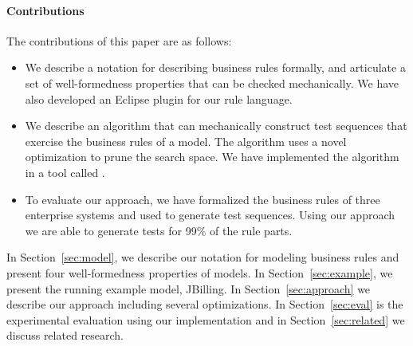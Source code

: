 \paragraph*{Contributions}

The contributions of this paper are as follows:
\begin{itemize}[noitemsep]
\item We describe a notation for describing business rules formally, and articulate
  a set of well-formedness properties that can be checked mechanically. We have 
  also developed an Eclipse plugin for our rule language.
\item We describe an algorithm that can mechanically construct test sequences
  that exercise the business rules of a model. The algorithm uses a
  novel optimization to prune the search space. We have implemented
  the algorithm in a tool called \tool{}.
\item To evaluate our approach, we have formalized the business rules
  of three enterprise systems and used \tool{} to generate test
  sequences. Using our approach we are able to generate tests for 99\%
  of the rule parts.
\end{itemize}

In Section~\ref{sec:model}, we describe our notation for modeling business
rules and present four well-formedness properties of
models. In Section~\ref{sec:example}, we present the running example
model, JBilling. In Section~\ref{sec:approach} we describe our approach including several
optimizations. In Section~\ref{sec:eval} is the experimental evaluation using
our implementation \tool{} and in Section~\ref{sec:related} we discuss related
research.   
